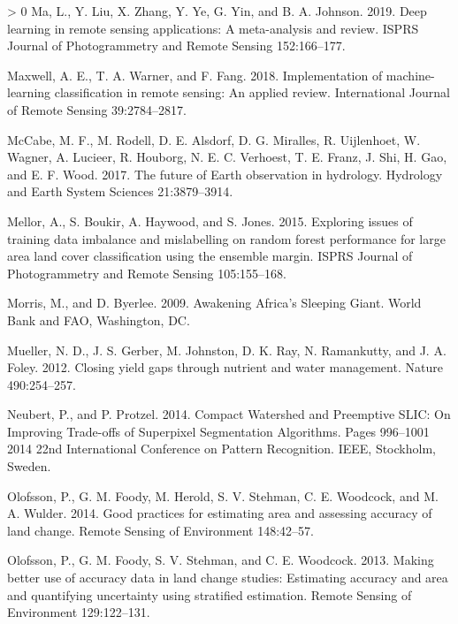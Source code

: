 \documentclass[11pt,a4paper]{article}
\newlength{\cslhangindent}
\newenvironment{CSLReferences}[3] %
 {%
  \setlength{\parindent}{0pt}
  \ifodd #1 \everypar{\setlength{\hangindent}{\cslhangindent}}\ignorespaces\fi
  \ifnum #2 > 0
  \setlength{\parskip}{#2\baselineskip}
  \fi
 }%
 {}
\begin{document}
\begin{CSLReferences}{1}{0}
\leavevmode\hypertarget{ref-maDeepLearningRemote2019}{}%
Ma, L., Y. Liu, X. Zhang, Y. Ye, G. Yin, and B. A. Johnson. 2019. Deep
learning in remote sensing applications: {A} meta-analysis and review.
ISPRS Journal of Photogrammetry and Remote Sensing 152:166--177.

\leavevmode\hypertarget{ref-MaxwellImplementationmachinelearningclassification2018}{}%
Maxwell, A. E., T. A. Warner, and F. Fang. 2018. Implementation of
machine-learning classification in remote sensing: An applied review.
International Journal of Remote Sensing 39:2784--2817.

\leavevmode\hypertarget{ref-McCabefutureEarthobservation2017}{}%
McCabe, M. F., M. Rodell, D. E. Alsdorf, D. G. Miralles, R. Uijlenhoet,
W. Wagner, A. Lucieer, R. Houborg, N. E. C. Verhoest, T. E. Franz, J.
Shi, H. Gao, and E. F. Wood. 2017. The future of {Earth} observation in
hydrology. Hydrology and Earth System Sciences 21:3879--3914.

\leavevmode\hypertarget{ref-mellorExploringIssuesTraining2015}{}%
Mellor, A., S. Boukir, A. Haywood, and S. Jones. 2015. Exploring issues
of training data imbalance and mislabelling on random forest performance
for large area land cover classification using the ensemble margin.
ISPRS Journal of Photogrammetry and Remote Sensing 105:155--168.

\leavevmode\hypertarget{ref-morrisAwakeningAfricaSleeping2009}{}%
Morris, M., and D. Byerlee. 2009. Awakening {Africa}'s {Sleeping Giant}.
{World Bank and FAO}, {Washington, DC}.

\leavevmode\hypertarget{ref-muellerClosingYieldGaps2012}{}%
Mueller, N. D., J. S. Gerber, M. Johnston, D. K. Ray, N. Ramankutty, and
J. A. Foley. 2012. Closing yield gaps through nutrient and water
management. Nature 490:254--257.

\leavevmode\hypertarget{ref-neubertCompactWatershedPreemptive2014}{}%
Neubert, P., and P. Protzel. 2014. Compact {Watershed} and {Preemptive
SLIC}: {On Improving Trade}-offs of {Superpixel Segmentation
Algorithms}. Pages 996--1001 2014 22nd {International Conference} on
{Pattern Recognition}. {IEEE}, {Stockholm, Sweden}.

\leavevmode\hypertarget{ref-OlofssonGoodpracticesestimating2014}{}%
Olofsson, P., G. M. Foody, M. Herold, S. V. Stehman, C. E. Woodcock, and
M. A. Wulder. 2014. Good practices for estimating area and assessing
accuracy of land change. Remote Sensing of Environment 148:42--57.

\leavevmode\hypertarget{ref-OlofssonMakingbetteruse2013}{}%
Olofsson, P., G. M. Foody, S. V. Stehman, and C. E. Woodcock. 2013.
Making better use of accuracy data in land change studies: {Estimating}
accuracy and area and quantifying uncertainty using stratified
estimation. Remote Sensing of Environment 129:122--131.


\end{CSLReferences}
\end{document}
